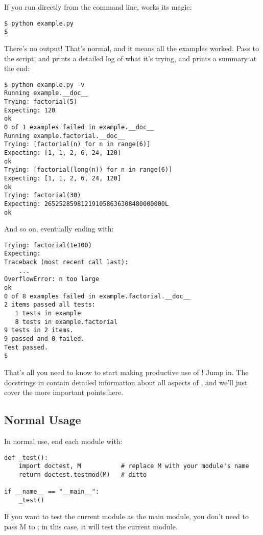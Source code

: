 If you run  directly from the command line,
 works its magic:

\begin{verbatim}
$ python example.py
$
\end{verbatim}

There's no output!  That's normal, and it means all the examples
worked.  Pass  to the script, and 
prints a detailed log of what it's trying, and prints a summary at the
end:

\begin{verbatim}
$ python example.py -v
Running example.__doc__
Trying: factorial(5)
Expecting: 120
ok
0 of 1 examples failed in example.__doc__
Running example.factorial.__doc__
Trying: [factorial(n) for n in range(6)]
Expecting: [1, 1, 2, 6, 24, 120]
ok
Trying: [factorial(long(n)) for n in range(6)]
Expecting: [1, 1, 2, 6, 24, 120]
ok
Trying: factorial(30)
Expecting: 265252859812191058636308480000000L
ok
\end{verbatim}

And so on, eventually ending with:

\begin{verbatim}
Trying: factorial(1e100)
Expecting:
Traceback (most recent call last):
    ...
OverflowError: n too large
ok
0 of 8 examples failed in example.factorial.__doc__
2 items passed all tests:
   1 tests in example
   8 tests in example.factorial
9 tests in 2 items.
9 passed and 0 failed.
Test passed.
$
\end{verbatim}

That's all you need to know to start making productive use of
!  Jump in.  The docstrings in  contain
detailed information about all aspects of , and we'll
just cover the more important points here.

\subsection{Normal Usage}

In normal use, end each module  with:

\begin{verbatim}
def _test():
    import doctest, M           # replace M with your module's name
    return doctest.testmod(M)   # ditto

if __name__ == "__main__":
    _test()
\end{verbatim}

If you want to test the current module as the main module, you don't need to
pass M to ; in this case, it will test the current
module.

